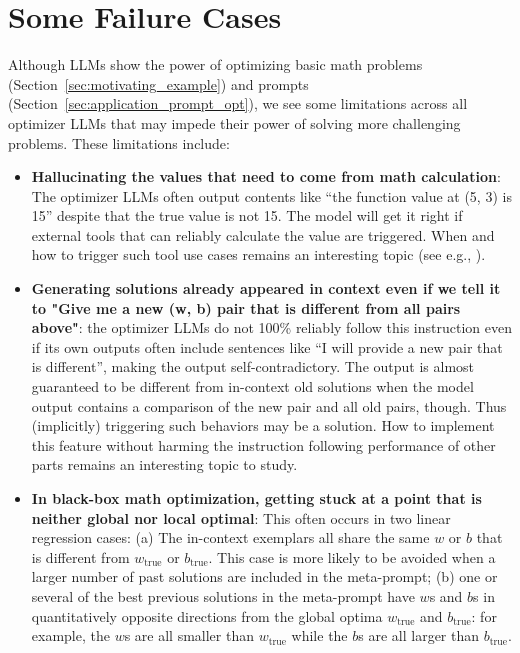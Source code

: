 \section{Some Failure Cases}
\label{appsec:some_failure_cases}
Although LLMs show the power of optimizing basic math problems (Section~\ref{sec:motivating_example}) and prompts (Section~\ref{sec:application_prompt_opt}), we see some limitations across all optimizer LLMs that may impede their power of solving more challenging problems.
These limitations include:
\begin{itemize}[leftmargin=2em,topsep=0pt,partopsep=1ex,parsep=0ex]
\item \textbf{Hallucinating the values that need to come from math calculation}: The optimizer LLMs often output contents like ``the function value at (5, 3) is 15'' despite that the true value is not 15. 
The model will get it right if external tools that can reliably calculate the value are triggered.
When and how to trigger such tool use cases remains an interesting topic (see e.g., \citep{schick2023toolformer,cai2023large}).
\item \textbf{Generating solutions already appeared in context even if we tell it to "Give me a new (w, b) pair that is different from all pairs above"}: the optimizer LLMs do not 100\% reliably follow this instruction even if its own outputs often include sentences like ``I will provide a new pair that is different'', making the output self-contradictory.
The output is almost guaranteed to be different from in-context old solutions when the model output contains a comparison of the new pair and all old pairs, though.
Thus (implicitly) triggering such behaviors may be a solution.
How to implement this feature without harming the instruction following performance of other parts remains an interesting topic to study.
\item \textbf{In black-box math optimization, getting stuck at a point that is neither global nor local optimal}: This often occurs in two linear regression cases: (a) The in-context exemplars all share the same $w$ or $b$ that is different from $w_\text{true}$ or $b_\text{true}$.
This case is more likely to be avoided when a larger number of past solutions are included in the meta-prompt; (b) one or several of the best previous solutions in the meta-prompt have $w$s and $b$s in quantitatively opposite directions from the global optima $w_\text{true}$ and $b_\text{true}$: for example, the $w$s are all smaller than $w_\text{true}$ while the $b$s are all larger than $b_\text{true}$.

\end{itemize}
